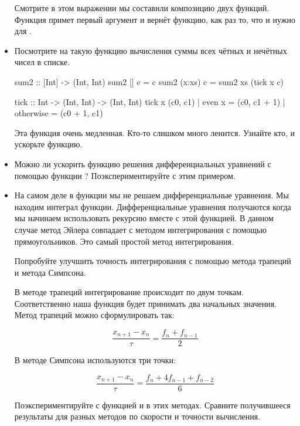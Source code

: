 \begin{itemize}
    Смотрите в этом выражении мы составили композицию двух
    функций. Функция \In{(:)} примет первый аргумент и вернёт
    функцию, как раз то, что и нужно для .


\item Посмотрите на такую функцию вычисления суммы
        всех чётных и нечётных чисел в списке. 

\begin{code}
sum2 :: [Int] -> (Int, Int)
sum2 []     c = c
sum2 (x:xs) c = sum2 xs (tick x c)

tick :: Int -> (Int, Int) -> (Int, Int)
tick x (c0, c1) | even x    = (c0, c1 + 1)
                | otherwise = (c0 + 1, c1)
\end{code} 

    Эта функция очень медленная. Кто-то слишком много ленится.
    Узнайте кто, и ускорьте функцию.
    
    
\item Можно ли ускорить функцию решения дифференциальных
    уравнений с помощью функции ? Поэкспериментируйте
    с этим примером.

\item На самом деле в функции  мы не решаем 
    дифференциальные уравнения. Мы находим интеграл функции.
    Дифференциальные уравнения получаются когда мы 
    начинаем использовать рекурсию вместе с этой функцией.
    В данном случае метод Эйлера совпадает с методом
    интегрирования с помощью прямоугольников. 
    Это самый простой метод интегрирования.

    Попробуйте улучшить точность интегрирования с помощью
    метода трапеций и метода Симпсона.

    В методе трапеций интегрирование происходит по двум
    точкам. Соответственно наша функция  будет
    принимать два начальных значения. Метод трапеций
    можно сформулировать так:

    \[  \frac{x_{n+1} - x_n}{\tau} = \frac{f_n + f_{n-1}}{2} \]

    В методе Симпсона используются три точки:

    \[  \frac{x_{n+1} - x_n}{\tau} = \frac{f_n + 4 f_{n-1}+f_{n-2}}{6} \]


    Поэкспериментируйте с функцией  и в этих методах.
    Сравните получившееся результаты для разных методов по скорости
    и точности вычисления.

\end{itemize}
